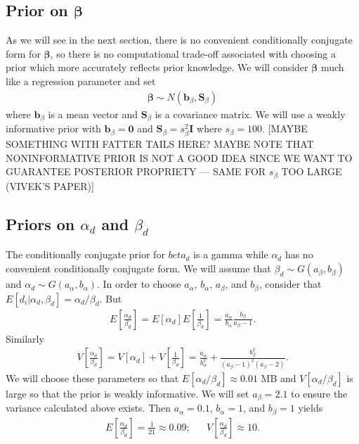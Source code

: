 \documentclass{article}
\begin{document}
\subsection{Prior on $\bm{\beta}$}
As we will see in the next section, there is no convenient conditionally conjugate form for $\bm{\beta}$, so there is no computational trade-off associated with choosing a prior which more accurately reflects prior knowledge. We will consider $\bm{\beta}$ much like a regression parameter and set
\begin{align*}
\bm{\beta} \sim N(\bm{b}_\beta, \bm{S}_\beta)
\end{align*}
where $\bm{b}_\beta$ is a mean vector and $\bm{S}_\beta$ is a covariance matrix. We will use a weakly informative prior with $\bm{b}_\beta = \bm{0}$ and $\bm{S}_\beta = s^2_\beta\bm{I}$ where $s_\beta = 100$.  [MAYBE SOMETHING WITH FATTER TAILS HERE? MAYBE NOTE THAT NONINFORMATIVE PRIOR IS NOT A GOOD IDEA SINCE WE WANT TO GUARANTEE POSTERIOR PROPRIETY --- SAME FOR $s_\beta$ TOO LARGE (VIVEK'S PAPER)]

\subsection{Priors on $\alpha_d$ and $\beta_d$}
The conditionally conjugate prior for $beta_d$ is a gamma while $\alpha_d$ has no convenient conditionally conjugate form. We will assume that $\beta_d \sim G(a_\beta, b_\beta)$ and $\alpha_d \sim G(a_\alpha, b_\alpha)$. In order to choose $a_\alpha$, $b_\alpha$, $a_\beta$, and $b_\beta$, consider that $E[d_i|\alpha_d,\beta_d] = \alpha_d/\beta_d$. But 
\begin{align*}
E\left[\frac{\alpha_d}{\beta_d}\right] = E[\alpha_d]E\left[\frac{1}{\beta_d}\right] = \frac{a_\alpha}{b_\alpha}\frac{b_\beta}{a_\beta - 1}.
\end{align*}
Similarly
\begin{align*}
V\left[\frac{\alpha_d}{\beta_d}\right] = V[\alpha_d] + V\left[\frac{1}{\beta_d}\right] = \frac{a_\alpha}{b_\alpha^2} + \frac{b_\beta^2}{(a_\beta - 1)^2(a_\beta - 2)}.
\end{align*}
We will choose these parameters so that $E[\alpha_d/\beta_d] \approx 0.01$ MB and $V[\alpha_d/\beta_d]$ is large so that the prior is weakly informative. We will set $a_\beta = 2.1$ to ensure the variance calculated above exists. Then $a_\alpha = 0.1$, $b_\alpha = 1$, and $b_\beta = 1$ yields
\begin{align*}
E\left[\frac{\alpha_d}{\beta_d}\right] = \frac{1}{21} \approx 0.09; && V\left[\frac{\alpha_d}{\beta_d}\right] \approx 10.
\end{align*}
\end{document}
